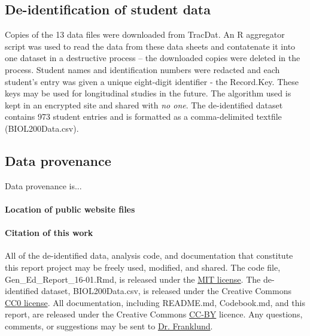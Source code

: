 \documentclass[fleqn,10pt]{SelfArx}\usepackage[]{graphicx}\usepackage[]{color}
\begin{document}
\subsection{De-identification of student data}
Copies of the 13 data files were downloaded from TracDat. An R aggregator script was used to read the data from these data sheets and contatenate it into one dataset in a destructive process -- the downloaded copies were deleted in the process. Student names and identification numbers were redacted and each student's entry was given a unique eight-digit identifier - the Record.Key. These keys may be used for longitudinal studies in the future. The algorithm used is kept in an encrypted site and shared with \textit{no one}. The de-identified dataset contains 973 student entries and is formatted as a comma-delimited textfile (BIOL200Data.csv).

\subsection{Data provenance}
Data provenance is...\citep{Buneman2001}

\paragraph{Location of public website files} \lipsum[1] %

\paragraph{Citation of this work}
All of the de-identified data, analysis code, and documentation that constitute this report project may be freely used, modified, and shared. The code file, Gen\_Ed\_Report\_16-01.Rmd, is released under the \href{https://opensource.org/licenses/MIT}{MIT license}. The de-identified dataset, BIOL200Data.csv, is released under the Creative Commons \href{https://creativecommons.org/publicdomain/zero/1.0/}{CC0 license}. All documentation, including README.md, Codebook.md, and this report, are released under the Creative Commons \href{https://creativecommons.org/licenses/by/4.0/}{CC-BY} licence. Any questions, comments, or suggestions may be sent to \href{mailto:CliftonFranklund@ferris.edu}{Dr. Franklund}.
\end{document}
